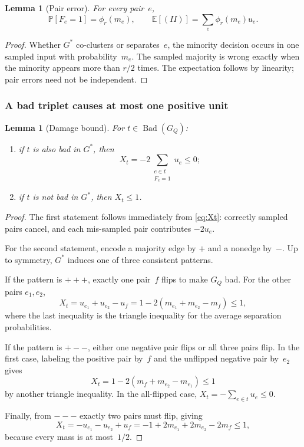 \documentclass[11pt,letterpaper]{article}
\newtheorem{lemma}[theorem]{Lemma}
\theoremstyle{definition}
\theoremstyle{remark}
\newcommand{\Bad}{\operatorname{Bad}}
\newcommand{\E}{\mathbb{E}}
\newcommand{\Prb}{\mathbb{P}}
\newcommand{\1}{\mathbf{1}}
\begin{document}
\begin{lemma}[Pair error]\label{lem:pair-error}
For every pair~$e$,
\[
 \Prb[F_e=1]=\phi_r(m_e),
 \qquad
 \E[(II)]=\sum_e\phi_r(m_e)u_e.
\]
\end{lemma}

\begin{proof}
Whether $G^*$ co-clusters or separates~$e$, the minority decision occurs in one sampled input with probability~$m_e$.  The sampled majority is wrong exactly when the minority appears more than $r/2$ times.  The expectation follows by linearity; pair errors need not be independent.
\end{proof}

\subsubsection{A bad triplet causes at most one positive unit}

\begin{lemma}[Damage bound]\label{lem:damage}
For $t\in\Bad(G_Q)$:
\begin{enumerate}[label=(\roman*),leftmargin=2em]
\item if $t$ is also bad in $G^*$, then
\[
 X_t=-2\sum_{\substack{e\in t\\F_e=1}}u_e\le0;
\]
\item if $t$ is not bad in $G^*$, then $X_t\le1$.
\end{enumerate}
\end{lemma}

\begin{proof}
The first statement follows immediately from \cref{eq:Xt}: correctly sampled pairs cancel, and each mis-sampled pair contributes $-2u_e$.

For the second statement, encode a majority edge by $+$ and a nonedge by~$-$.  Up to symmetry, $G^*$ induces one of three consistent patterns.

If the pattern is $+++$, exactly one pair~$f$ flips to make $G_Q$ bad.  For the other pairs $e_1,e_2$,
\[
 X_t=u_{e_1}+u_{e_2}-u_f
 =1-2(m_{e_1}+m_{e_2}-m_f)\le1,
\]
where the last inequality is the triangle inequality for the average separation probabilities.

If the pattern is $+--$, either one negative pair flips or all three pairs flip.  In the first case, labeling the positive pair by~$f$ and the unflipped negative pair by~$e_2$ gives
\[
 X_t=1-2(m_f+m_{e_2}-m_{e_1})\le1
\]
by another triangle inequality.  In the all-flipped case, $X_t=-\sum_{e\in t}u_e\le0$.

Finally, from $---$ exactly two pairs must flip, giving
\[
 X_t=-u_{e_1}-u_{e_2}+u_f
 =-1+2m_{e_1}+2m_{e_2}-2m_f\le1,
\]
because every mass is at most~$1/2$.
\end{proof}
\end{document}
